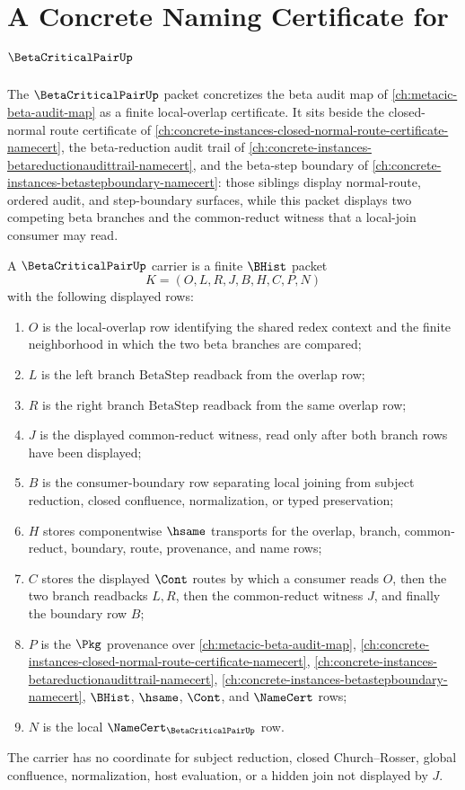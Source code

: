 \chapter{A Concrete Naming Certificate for $\BetaCriticalPairUp$}
\label{ch:concrete-instances-beta-critical-pair-namecert}

The $\BetaCriticalPairUp$ packet concretizes the beta audit map of \autoref{ch:metacic-beta-audit-map} as a finite local-overlap certificate. It sits beside the closed-normal route certificate of \autoref{ch:concrete-instances-closed-normal-route-certificate-namecert}, the beta-reduction audit trail of \autoref{ch:concrete-instances-betareductionaudittrail-namecert}, and the beta-step boundary of \autoref{ch:concrete-instances-betastepboundary-namecert}: those siblings display normal-route, ordered audit, and step-boundary surfaces, while this packet displays two competing beta branches and the common-reduct witness that a local-join consumer may read.

\begin{definition}
\label{def:beta-critical-pair-carrier}
A $\BetaCriticalPairUp$ carrier is a finite $\BHist$ packet
$$
K=(O,L,R,J,B,H,C,P,N)
$$
with the following displayed rows:
\begin{enumerate}
\item $O$ is the local-overlap row identifying the shared redex context and the finite neighborhood in which the two beta branches are compared;
\item $L$ is the left branch $\mathrm{BetaStep}$ readback from the overlap row;
\item $R$ is the right branch $\mathrm{BetaStep}$ readback from the same overlap row;
\item $J$ is the displayed common-reduct witness, read only after both branch rows have been displayed;
\item $B$ is the consumer-boundary row separating local joining from subject reduction, closed confluence, normalization, or typed preservation;
\item $H$ stores componentwise $\hsame$ transports for the overlap, branch, common-reduct, boundary, route, provenance, and name rows;
\item $C$ stores the displayed $\Cont$ routes by which a consumer reads $O$, then the two branch readbacks $L,R$, then the common-reduct witness $J$, and finally the boundary row $B$;
\item $P$ is the $\Pkg$ provenance over \autoref{ch:metacic-beta-audit-map}, \autoref{ch:concrete-instances-closed-normal-route-certificate-namecert}, \autoref{ch:concrete-instances-betareductionaudittrail-namecert}, \autoref{ch:concrete-instances-betastepboundary-namecert}, $\BHist$, $\hsame$, $\Cont$, and $\NameCert$ rows;
\item $N$ is the local $\NameCert_{\BetaCriticalPairUp}$ row.
\end{enumerate}
The carrier has no coordinate for subject reduction, closed Church--Rosser, global confluence, normalization, host evaluation, or a hidden join not displayed by $J$.
\end{definition}

